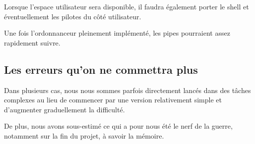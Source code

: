 \documentclass[a4paper, 11pt, twoside]{article}
\begin{document}
Lorsque l'espace utilisateur sera disponible, il faudra également porter le
shell et éventuellement les pilotes du côté utilisateur.

Une fois l'ordonnanceur pleinement implémenté, les pipes pourraient assez 
rapidement suivre.

\subsection{Les erreurs qu'on ne commettra plus}

Dans plusieurs cas, nous nous sommes parfois directement lancés dans des tâches complexes
au lieu de commencer par une version relativement simple et d'augmenter graduellement la difficulté.

De plus, nous avons sous-estimé ce qui a pour nous été le nerf de la guerre, notamment
sur la fin du projet, à savoir la mémoire.
\end{document}

